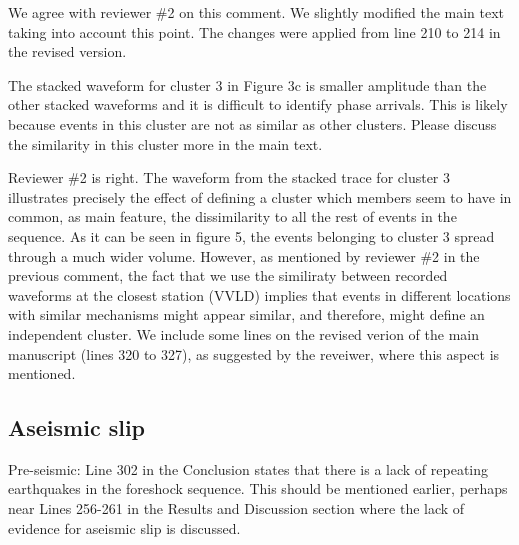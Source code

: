 \documentclass[10pt]{extarticle}
\begin{document}
\begin{Answer}
We agree with reviewer \#2 on this comment. We slightly modified the main text taking into account this point. The changes were applied from line 210 to 214 in the revised version.
 \WorkInProgressRevTask
\end{Answer}
%
%



\begin{ReviewerComment}{2}
\noindent 
The stacked waveform for cluster 3 in Figure 3c is smaller amplitude than the other stacked waveforms and it is difficult to identify phase arrivals. This is likely because events in this cluster are not as similar as other clusters. Please discuss the similarity in this cluster more in the main text.

\end{ReviewerComment}


\begin{Answer}
Reviewer \#2 is right. The waveform from the stacked trace for cluster 3 illustrates precisely the effect of defining a cluster which members seem to have in common, as main feature, the dissimilarity to all the rest of events in the sequence. As it can be seen in figure 5, the events belonging to cluster 3 spread through a much wider volume. However, as mentioned by reviewer \#2 in the previous comment, the fact that we use the similiraty between recorded waveforms at the closest station (VVLD) implies that events in different locations with similar mechanisms might appear similar, and therefore, might define an independent cluster. We include some lines on the revised verion of the main manuscript (lines 320 to 327), as suggested by the reveiwer, where this aspect is mentioned.
 \WorkInProgressRevTask
\end{Answer}
%
%


\subsection*{Aseismic slip}


\begin{ReviewerComment}{2}
\noindent 
Pre-seismic: Line 302 in the Conclusion states that there is a lack of repeating earthquakes in the foreshock sequence. This should be mentioned earlier, perhaps near Lines 256-261 in the Results and Discussion section where the lack of evidence for aseismic slip is discussed.

\end{ReviewerComment}
\end{document}
